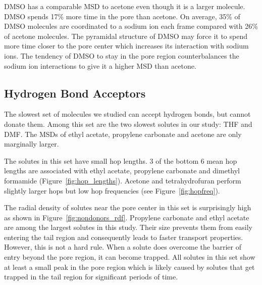 \documentclass[journal=jpcbfk,manuscript=article]{achemso}
\begin{document}
  DMSO has a comparable MSD to acetone even though it is a larger molecule. 
  DMSO spends 17\% more time in the pore than acetone. 
  On average, 35\% of DMSO molecules are coordinated to a sodium ion each
  frame compared with 26\% of acetone molecules. The pyramidal structure 
  of DMSO may force it to spend more time closer to the pore center which
  increases its interaction with sodium ions. The tendency of DMSO to stay
  in the pore region counterbalances the sodium ion interactions to give it
  a higher MSD than acetone. 
  
  \subsection{Hydrogen Bond Acceptors}  %

  The slowest set of molecules we studied can accept hydrogen bonds, but
  cannot donate them. Among this set are the two slowest solutes in our study: 
  THF and DMF. The MSDs of ethyl acetate, propylene carbonate and acetone are
  only marginally larger.
  
  The solutes in this set have small hop lengths. 3 of the bottom 6 mean hop
  lengths are associated with ethyl acetate, propylene carbonate and
  dimethyl formamide (Figure~\ref{fig:hop_lengths}). Acetone and 
  tetrahydrofuran perform slightly larger hops but low hop frequencies
  (see Figure~\ref{fig:hopfreq}).
  
  The radial density of solutes near the pore center in this set is 
  surprisingly high as shown in Figure~\ref{fig:nondonors_rdf}. Propylene
  carbonate and ethyl acetate are among the largest solutes in this study. 
  Their size prevents them from easily entering the tail region and 
  consequently leads to faster transport properties.  %
  However, this is not a hard rule. When a solute does overcome the 
  barrier of entry beyond the pore region, it can become trapped. All
  solutes in this set show at least a small peak in the pore region which
  is likely caused by solutes that get trapped in the tail region for 
  significant periods of time.
    
  
\end{document}
